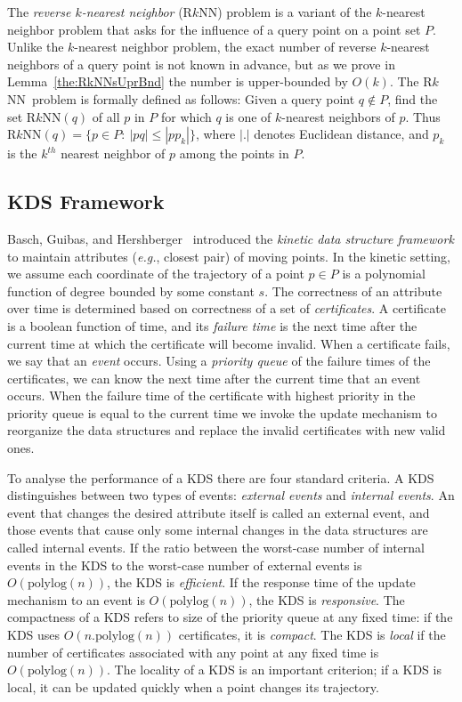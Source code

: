 \documentclass[preprint,12pt]{elsarticle}
\def\rknn{\mbox{R$k$NN}}
\newcommand{\eg}{\emph{e.g.}}
\begin{document}
The \textit{reverse $k$-nearest neighbor} (\rknn) problem is a variant of the $k$-nearest neighbor problem that asks for the influence of a query point on a point set $P$. Unlike the $k$-nearest neighbor problem, the exact number of reverse $k$-nearest neighbors of a query point is not known in advance, but as we prove in Lemma~\ref{the:RkNNsUprBnd} the number is upper-bounded by $O(k)$. The \rknn~problem is formally defined as follows: Given a query point $q\notin P$, find the set $\rknn(q)$ of all $p$ in $P$ for which $q$ is one of $k$-nearest neighbors of $p$. Thus $\rknn(q)=\{p\in P:~|pq|\leq |pp_k|\}$, where $|.|$ denotes Euclidean distance, and $p_k$ is the $k^{th}$ nearest neighbor of $p$ among the points in $P$.

\subsection{KDS Framework}\label{sec:KDSframework}
Basch, Guibas, and Hershberger~\cite{Basch:1997:DSM:314161.314435} introduced the \textit{kinetic data structure framework} to maintain attributes (\eg, closest pair) of moving points. In the kinetic setting, we assume each coordinate of the trajectory of a point $p\in P$ is a polynomial function of degree bounded by some constant $s$. The correctness of an attribute over time is determined based on correctness of a set of \textit{certificates}. A certificate is a boolean function of time, and its \textit{failure time} is the next time after the current time at which the certificate will become invalid. When a certificate fails, we say that an \textit{event} occurs. Using a \textit{priority queue} of the failure times of the certificates, we can know the next time after the current time that an event occurs. When the failure time of the certificate with highest priority in the priority queue is equal to the current time we invoke the update mechanism to reorganize the data structures and replace the invalid certificates with new valid ones. 

To analyse the performance of a KDS there are four standard criteria. A KDS distinguishes between two types of events: \textit{external events} and \textit{internal events}. An event that changes the desired attribute itself is called an external event, and those events that cause only some internal changes in the data structures are called internal events. If the ratio between the  worst-case number of internal events in the KDS to the worst-case number of external events is $O(\text{polylog}(n))$, the KDS is \textit{efficient}. If the response time of the update mechanism to an event is $O(\text{polylog}(n))$, the KDS is \textit{responsive}. The compactness of a KDS refers to size of the priority queue at any fixed time: if the KDS uses $O(n.\text{polylog}(n))$ certificates, it is \textit{compact}. The KDS is \textit{local} if the number of certificates associated with any point at any fixed time is $O(\text{polylog}(n))$. The locality of a KDS is an important criterion; if a KDS is local, it can be updated quickly when a point changes its trajectory.
\end{document}
